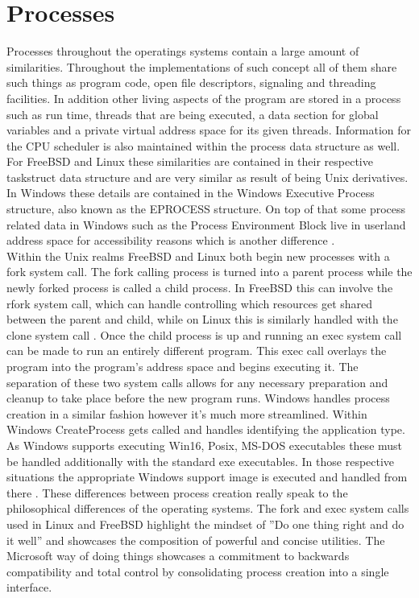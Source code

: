\documentclass[letterpaper,10pt,draftclsnofoot,onecolumn]{IEEEtran}
\begin{document}
\section{Processes}
Processes throughout the operatings systems contain a large amount of similarities. Throughout the implementations of such concept all of them share such things as program code, open file descriptors, signaling and threading facilities. In addition other living aspects of the program are stored in a process such as run time, threads that are being executed, a data section for global variables and a private virtual address space for its given threads. Information for the CPU scheduler is also maintained within the process data structure as well. For FreeBSD and Linux these similarities are contained in their respective task\textunderscore struct data structure and are very similar as result of being Unix derivatives. In Windows these details are contained in the Windows Executive Process structure, also known as the EPROCESS structure. On top of that some process related data in Windows such as the Process Environment Block live in userland address space for accessibility reasons which is another difference \cite{russinovich}.\\
Within the Unix realms FreeBSD and Linux both begin new processes with a fork system call. The fork calling process is turned into a parent process while the newly forked process is called a child process. In FreeBSD this can involve the rfork system call, which can handle controlling which resources get shared between the parent and child, while on Linux this is similarly handled with the clone system call \cite{love}. Once the child process is up and running an exec system call can be made to run an entirely different program. This exec call overlays the program into the program’s address space and begins executing it. The separation of these two system calls allows for any necessary preparation and cleanup to take place before the new program runs. Windows handles process creation in a similar fashion however it’s much more streamlined. Within Windows CreateProcess gets called and handles identifying the application type. As Windows supports executing Win16, Posix, MS-DOS executables these must be handled additionally with the standard exe executables. In those respective situations the appropriate Windows support image is executed and handled from there \cite{russinovich}. These differences between process creation really speak to the philosophical differences of the operating systems. The fork and exec system calls used in Linux and FreeBSD highlight the mindset of ''Do one thing right and do it well'' and showcases the composition of powerful and concise utilities. The Microsoft way of doing things showcases a commitment to backwards compatibility and total control by consolidating process creation into a single interface.
\par
\end{document}
